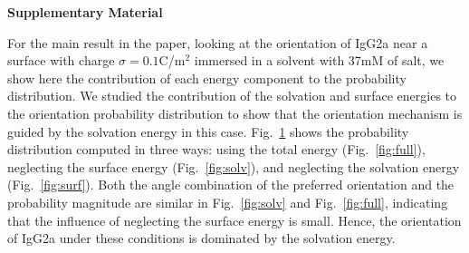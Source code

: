 \documentclass[aip,notitlepage,reprint]{revtex4-1}
\newcommand{\ig}{{\small IgG}}
\begin{document}
\begin{center}
\textbf{Supplementary Material}
\end{center}
For the main result in the paper, looking at the orientation of \ig 2a near a surface with charge $\sigma=0.1$C/m$^2$ immersed in a solvent with 37mM of salt, we show here the contribution of each energy component to the probability distribution.
We studied the contribution of the solvation and surface energies to the orientation probability distribution to show that the orientation mechanism is guided by the solvation energy in this case.
Fig.~\ref{fig:supp} shows the probability distribution computed in three ways: using the total energy (Fig.~\ref{fig:full}), neglecting the surface energy (Fig.~\ref{fig:solv}), and neglecting the solvation energy (Fig.~\ref{fig:surf}). 
Both the angle combination of the preferred orientation and the probability magnitude are similar in Fig.~\ref{fig:solv} and Fig.~\ref{fig:full}, indicating that the influence of neglecting the surface energy is small.
Hence, the orientation of \ig 2a under these conditions is dominated by the solvation energy.


\begin{figure} 
   \centering
   \\
   \\
   \caption{}
   \label{fig:supp}
\end{figure}

\clearpage
\end{document}
